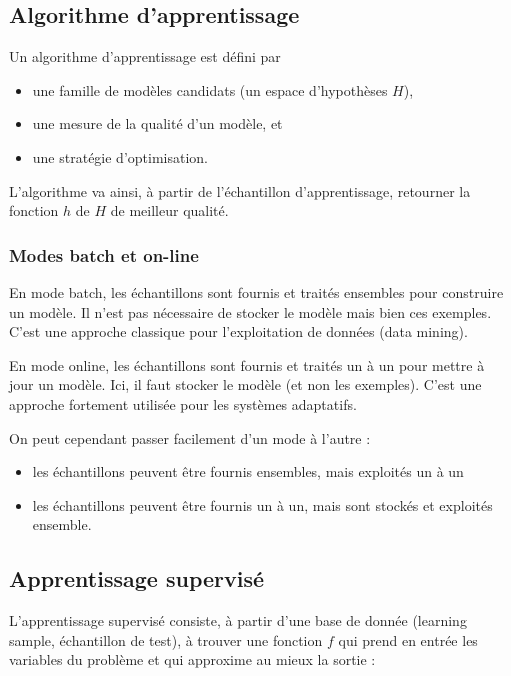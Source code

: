 		\subsection{Algorithme d'apprentissage}
		
		Un algorithme d'apprentissage est défini par

		\begin{itemize}
			\item une famille de modèles candidats (un espace d'hypothèses $H$),
			\item une mesure de la qualité d'un modèle, et
			\item une stratégie d'optimisation.
		\end{itemize}

		L'algorithme va ainsi, à partir de l'échantillon d'apprentissage, retourner la fonction $h$ de $H$ de meilleur qualité.
					
			\subsubsection{Modes batch et on-line}
		
			En mode batch, les échantillons sont fournis et traités ensembles pour construire un modèle. Il n'est pas nécessaire de stocker le modèle mais bien ces exemples. C'est une approche classique pour l'exploitation de données (data mining).
			
		En mode online, les échantillons sont fournis et traités un à un pour mettre à jour un modèle. Ici, il faut stocker le modèle (et non les exemples). C'est une approche fortement utilisée pour les systèmes adaptatifs.
		
			On peut cependant passer facilement d'un mode à l'autre :
		
			\begin{itemize}
				\item les échantillons peuvent être fournis ensembles, mais exploités un à un
				\item les échantillons peuvent être fournis un à un, mais sont stockés et exploités ensemble.
			\end{itemize}
		
		\subsection{Apprentissage supervisé}
		
		L'apprentissage supervisé consiste, à partir d'une base de donnée (learning sample, échantillon de test), à trouver une fonction $f$ qui prend en entrée les variables du problème et qui approxime au mieux la sortie :

